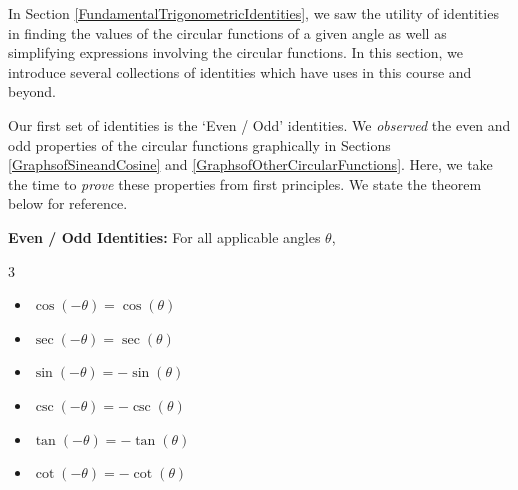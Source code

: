 \documentclass{ximera}
\begin{document}
	\author{Stitz-Zeager}




\setcounter{footnote}{0}

\label{MoreTrigonometricIdentities}

 

In Section \ref{FundamentalTrigonometricIdentities}, we saw the utility of identities in finding the values of the circular functions of a given angle as well as simplifying expressions involving the circular functions.  In this section, we introduce several collections of identities which have uses in this course and beyond. 

 

Our first set of identities is the `Even / Odd' identities.  We \textit{observed} the even and odd  properties of the circular functions graphically in Sections \ref{GraphsofSineandCosine} and \ref{GraphsofOtherCircularFunctions}.  Here, we take the time to \textit{prove} these properties from first principles.  We state the theorem below for reference.

 


\begin{theorem} \label{evenodd}  \textbf{Even / Odd Identities:}  For all applicable angles $\theta$,  

\vspace{-.05in}

\begin{multicols}{3}

\begin{itemize}

\item  $\cos(-\theta) = \cos(\theta)$

\item  $\sec(-\theta) = \sec(\theta)$

\item  $\sin(-\theta) = -\sin(\theta)$

\item  $\csc(-\theta) = -\csc(\theta)$

\item  $\tan(-\theta) = -\tan(\theta)$

\item  $\cot(-\theta) = -\cot(\theta)$

\end{itemize}

\end{multicols}

\end{theorem}
\end{document}
